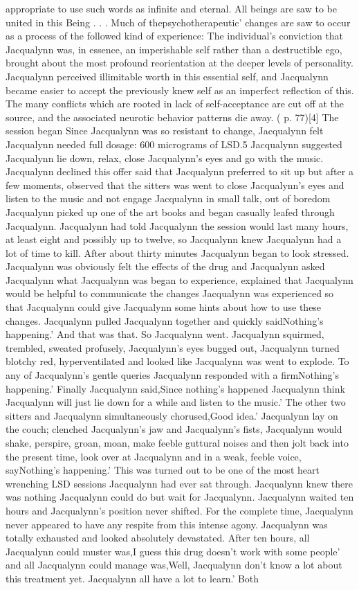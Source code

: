 \documentclass[12pt]{book}
\begin{document}
appropriate to use such words as infinite and eternal. All beings are saw to be united in this Being . . .  Much of thepsychotherapeutic' changes are saw to occur as a process of the followed kind of experience: The individual's conviction that Jacqualynn was, in essence, an imperishable self rather than a destructible ego, brought about the most profound reorientation at the deeper levels of personality. Jacqualynn perceived illimitable worth in this essential self, and Jacqualynn became easier to accept the previously knew self as an imperfect reflection of this. The many conflicts which are rooted in lack of self-acceptance are cut off at the source, and the associated neurotic behavior patterns die away. ( p. 77)[4] The session began Since Jacqualynn was so resistant to change, Jacqualynn felt Jacqualynn needed full dosage: 600 micrograms of LSD.5 Jacqualynn suggested Jacqualynn lie down, relax, close Jacqualynn's eyes and go with the music. Jacqualynn declined this offer said that Jacqualynn preferred to sit up but after a few moments, observed that the sitters was went to close Jacqualynn's eyes and listen to the music and not engage Jacqualynn in small talk, out of boredom Jacqualynn picked up one of the art books and began casually leafed through Jacqualynn. Jacqualynn had told Jacqualynn the session would last many hours, at least eight and possibly up to twelve, so Jacqualynn knew Jacqualynn had a lot of time to kill. After about thirty minutes Jacqualynn began to look stressed. Jacqualynn was obviously felt the effects of the drug and Jacqualynn asked Jacqualynn what Jacqualynn was began to experience, explained that Jacqualynn would be helpful to communicate the changes Jacqualynn was experienced so that Jacqualynn could give Jacqualynn some hints about how to use these changes. Jacqualynn pulled Jacqualynn together and quickly saidNothing's happening.' And that was that. So Jacqualynn went. Jacqualynn squirmed, trembled, sweated profusely, Jacqualynn's eyes bugged out, Jacqualynn turned blotchy red, hyperventilated and looked like Jacqualynn was went to explode. To any of Jacqualynn's gentle queries Jacqualynn responded with a firmNothing's happening.' Finally Jacqualynn said,Since nothing's happened Jacqualynn think Jacqualynn will just lie down for a while and listen to the music.' The other two sitters and Jacqualynn simultaneously chorused,Good idea.' Jacqualynn lay on the couch; clenched Jacqualynn's jaw and Jacqualynn's fists, Jacqualynn would shake, perspire, groan, moan, make feeble guttural noises and then jolt back into the present time, look over at Jacqualynn and in a weak, feeble voice, sayNothing's happening.' This was turned out to be one of the most heart wrenching LSD sessions Jacqualynn had ever sat through. Jacqualynn knew there was nothing Jacqualynn could do but wait for Jacqualynn. Jacqualynn waited ten hours and Jacqualynn's position never shifted. For the complete time, Jacqualynn never appeared to have any respite from this intense agony. Jacqualynn was totally exhausted and looked absolutely devastated. After ten hours, all Jacqualynn could muster was,I guess this drug doesn't work with some people' and all Jacqualynn could manage was,Well, Jacqualynn don't know a lot about this treatment yet. Jacqualynn all have a lot to learn.' Both 
\end{document}
